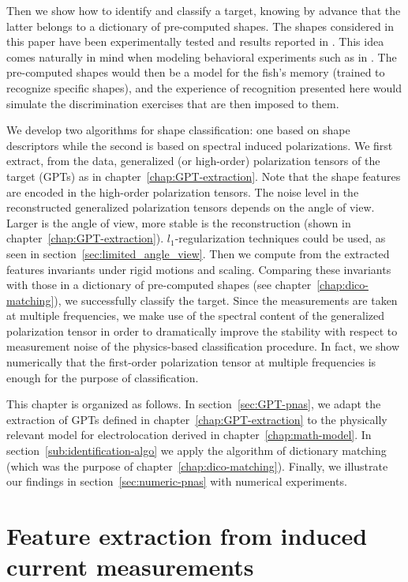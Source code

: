 Then we show how to identify and classify a target,
knowing by advance that the latter belongs to a dictionary of
pre-computed shapes. The shapes considered in this paper have been
experimentally tested and results reported in \cite{gerhard}. This
idea comes naturally in mind when modeling behavioral experiments
such as in \cite{von1999active,von2007distance,von1993electric}.
The pre-computed shapes would then be a model for the fish's
memory (trained to recognize specific shapes), and the experience
of recognition presented here would simulate the discrimination
exercises that are then imposed to them.

We develop two algorithms
for shape classification: one based on shape descriptors while the
second is based on spectral induced polarizations. We first
extract, from the data, generalized (or high-order) polarization
tensors of the target (GPTs) as in chapter~\ref{chap:GPT-extraction}. Note that the shape
features are encoded in the high-order polarization tensors.
The noise level in the reconstructed generalized polarization
tensors depends on the angle of view. Larger is the angle of view,
more stable is the reconstruction (shown in chapter~\ref{chap:GPT-extraction}).
$l_1$-regularization techniques
could be used, as seen in section~\ref{sec:limited_angle_view}.
Then we compute from the extracted features
invariants under rigid motions and scaling. Comparing these
invariants with those in a dictionary of pre-computed shapes (see
chapter~\ref{chap:dico-matching}), we
successfully classify the target. Since the measurements are taken
at multiple frequencies, we make use of the spectral content of
the generalized polarization tensor in order to dramatically
improve the stability with respect to measurement noise of the
physics-based classification procedure. In fact, we show
numerically that the first-order polarization tensor at multiple
frequencies is enough for the purpose of classification.

This chapter is organized as follows. In section~\ref{sec:GPT-pnas}, we adapt
the extraction of GPTs defined in chapter~\ref{chap:GPT-extraction} to the physically
relevant model for electrolocation derived in chapter~\ref{chap:math-model}. In
section~\ref{sub:identification-algo} we apply the algorithm of dictionary matching
(which was the purpose of chapter~\ref{chap:dico-matching}). Finally, we illustrate
our findings in section~\ref{sec:numeric-pnas} with numerical experiments.


\section{Feature extraction from induced current measurements}

